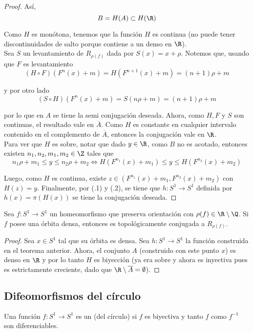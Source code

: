 \documentclass[	docname= Sistemas\ Din\'amicos,
				finished=1,
				semester=1,
				year=2017,
				professor=Godofredo\ Iommi,
				sigla=MAT2565]{apunte}
\begin{document}
\begin{proof}
Así,
	$$B = H(A) \subset H(\R)$$

Como $H$ es monótona, tenemos que la función $H$ es continua (no puede tener discontinuidades de salto porque contiene a un denso en $\R$).	\\

Sea $S$ un levantamiento de $R_{\rho(f)}$ dada por $S(x) = x+ \rho$. Notemos que, usando que $F$ es levantamiento
	\[ (H \circ F)(F^{n}(x) + m) = H(F^{n+1}(x) + m) = (n+1)\rho + m		\tag{\theteo.1} \]

y por otro lado
	\[ (S \circ H)(F^{n}(x)+ m) = S(n\rho + m) = (n+1)\rho + m		\tag{\theteo.2} \]
	
por lo que en $A$ se tiene la semi conjugación deseada. Ahora, como $H, F$ y $S$ son continuas, el resultado vale en $\overline{A}$. Como $H$ es constante en cualquier intervalo contenido en el complemento de $\overline{A}$, entonces la conjugación vale en $\R$.	\\

Para ver que $H$ es sobre, notar que dado $y \in \R$, como $B$ no es acotado, entonces existen $n_{1}, n_{2}, m_{1}, m_{2} \in \Z$ tales que
	$$n_{1}\rho + m_{1} \leq y  \leq n_{2}\rho + m_{2}  \Longleftrightarrow H(F^{n_{1}}(x) + m_{1}) \leq y \leq H(F^{n_{2}}(x) + m_{2}) $$

Luego, como $H$ es continua, existe $z \in (F^{n_{1}}(x) + m_{1}, F^{n_{2}}(x) + m_{2})$ con $H(z) = y$. Finalmente, por (\theteo.1) y (\theteo.2), se tiene que $h: S^{1} \to S^{1}$ definida por $h(x) = \pi(H(x))$ se tiene la conjugación deseada.
\end{proof}

\begin{teo}[Poincaré]  Sea $f: S^{1} \to S^{1}$ un homeomorfismo que preserva orientación con $\rho(f) \in \R \setminus \Q$. Si $f$ posee una órbita densa, entonces es topológicamente conjugada a $R_{\rho(f)}$.  
\end{teo}

\begin{proof} Sea $x \in S^{1}$ tal que su órbita es densa. Sea $h : S^{1} \to S^{1}$ la función construida en el teorema anterior. Ahora, el conjunto $A$ (construido con este punto $x$) es denso en $\R$ y por lo tanto $H$ es biyección (ya era sobre y ahora es inyectiva pues es estrictamente creciente, dado que $\R \setminus \overline{A} = \emptyset$).
\end{proof}

\subsection{Difeomorfismos del círculo}
\begin{defn} Una función $f: S^{1} \to S^{1}$ es un  (del círculo) si $f$ es biyectiva y tanto $f$ como $f^{-1}$ son diferenciables.
\end{defn}
\end{document}
